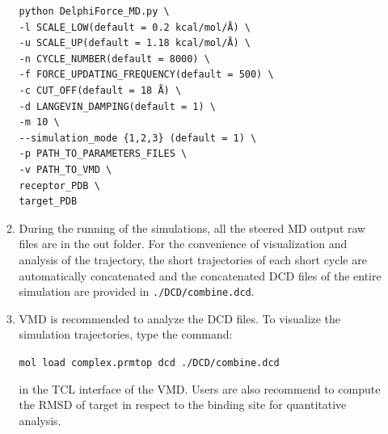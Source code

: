 \documentclass[9pt,tutorial]{livecoms}
\begin{document}
\begin{enumerate}
\begin{enumerate}
\begin{verbatim}
python DelphiForce_MD.py \
-l SCALE_LOW(default = 0.2 kcal/mol/Å) \
-u SCALE_UP(default = 1.18 kcal/mol/Å) \
-n CYCLE_NUMBER(default = 8000) \
-f FORCE_UPDATING_FREQUENCY(default = 500) \
-c CUT_OFF(default = 18 Å) \
-d LANGEVIN_DAMPING(default = 1) \
-m 10 \
--simulation_mode {1,2,3} (default = 1) \
-p PATH_TO_PARAMETERS_FILES \
-v PATH_TO_VMD \
receptor_PDB \
target_PDB
\end{verbatim}

\item During the running of the simulations, all the steered MD output raw files are in the out folder. For the convenience of visualization and analysis of the trajectory, the short trajectories of each short cycle are automatically concatenated and the concatenated DCD files of the entire simulation are provided in \texttt{./DCD/combine.dcd}.
\item VMD is recommended to analyze the DCD files. To visualize the simulation trajectories, type the command:

\texttt{mol load complex.prmtop dcd ./DCD/combine.dcd}

in the TCL interface of the VMD. Users are also recommend to compute the RMSD of target in respect to the binding site for quantitative analysis.
\end{enumerate}
\end{enumerate}
\end{document}
